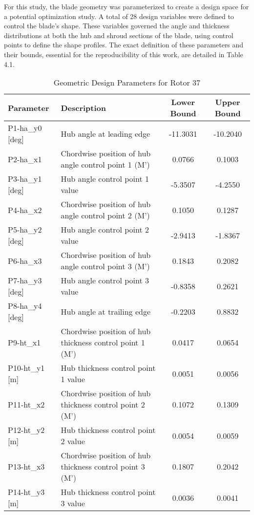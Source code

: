 \documentclass[dsc, EN]{ufabcFHZh}
\begin{document}
{For this study, the blade geometry was parameterized to create a design space for a potential optimization study. A total of 28 design variables were defined to control the blade's shape. These variables governed the angle and thickness distributions at both the hub and shroud sections of the blade, using control points to define the shape profiles. The exact definition of these parameters and their bounds, essential for the reproducibility of this work, are detailed in Table 4.1.

\begin{table}[htbp]
  \centering
  \caption{Geometric Design Parameters for Rotor 37}
  \label{tab:rotor_37_parameters}
  \small %
  \begin{tabular}{|l|l|c|c|}
    \hline
    \textbf{Parameter} & \textbf{Description} & \textbf{Lower Bound} & \textbf{Upper Bound} \\
    \hline
    P1-ha\_y0 [deg] & Hub angle at leading edge & -11.3031 & -10.2040 \\
    P2-ha\_x1 & Chordwise position of hub angle control point 1 (M') & 0.0766 & 0.1003 \\
    P3-ha\_y1 [deg] & Hub angle control point 1 value & -5.3507 & -4.2550 \\
    P4-ha\_x2 & Chordwise position of hub angle control point 2 (M') & 0.1050 & 0.1287 \\
    P5-ha\_y2 [deg] & Hub angle control point 2 value & -2.9413 & -1.8367 \\
    P6-ha\_x3 & Chordwise position of hub angle control point 3 (M') & 0.1843 & 0.2082 \\
    P7-ha\_y3 [deg] & Hub angle control point 3 value & -0.8358 & 0.2621 \\
    P8-ha\_y4 [deg] & Hub angle at trailing edge & -0.2203 & 0.8832 \\
    P9-ht\_x1 & Chordwise position of hub thickness control point 1 (M') & 0.0417 & 0.0654 \\
    P10-ht\_y1 [m] & Hub thickness control point 1 value & 0.0051 & 0.0056 \\
    P11-ht\_x2 & Chordwise position of hub thickness control point 2 (M') & 0.1072 & 0.1309 \\
    P12-ht\_y2 [m] & Hub thickness control point 2 value & 0.0054 & 0.0059 \\
    P13-ht\_x3 & Chordwise position of hub thickness control point 3 (M') & 0.1807 & 0.2042 \\
    P14-ht\_y3 [m] & Hub thickness control point 3 value & 0.0036 & 0.0041 \\

\end{tabular}
\end{table}}
\end{document}
